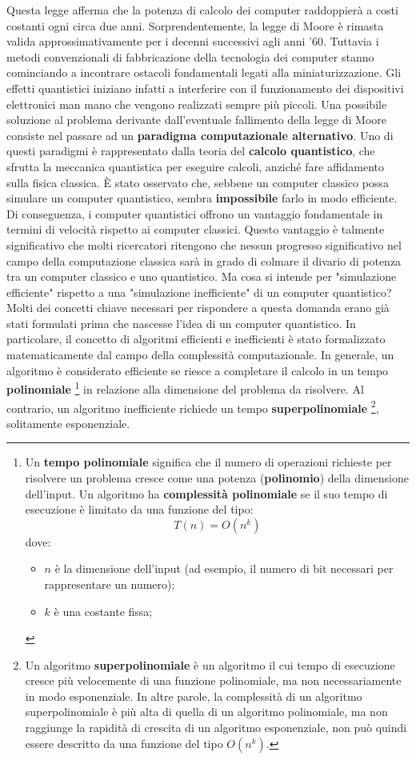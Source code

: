 \documentclass[a4paper,12pt]{report}
\theoremstyle{plain}
\begin{document}
Questa legge afferma che la potenza di calcolo dei computer raddoppierà a costi costanti ogni circa due anni. Sorprendentemente, la legge di Moore è rimasta valida approssimativamente per i decenni successivi agli anni '60. 
Tuttavia i metodi convenzionali di fabbricazione della tecnologia dei computer stanno cominciando a incontrare ostacoli fondamentali legati alla miniaturizzazione. Gli effetti quantistici iniziano infatti a interferire con il funzionamento dei dispositivi elettronici man mano che vengono realizzati sempre più piccoli. 
Una possibile soluzione al problema derivante dall'eventuale fallimento della legge di Moore consiste nel passare ad un \textbf{paradigma computazionale alternativo}. 
Uno di questi paradigmi è rappresentato dalla teoria del \textbf{calcolo quantistico}, che sfrutta la meccanica quantistica per eseguire calcoli, anziché fare affidamento sulla fisica classica. È stato osservato che, sebbene un computer classico possa simulare un computer quantistico, sembra \textbf{impossibile} farlo in modo efficiente. 
Di conseguenza, i computer quantistici offrono un vantaggio fondamentale in termini di velocità rispetto ai computer classici. Questo vantaggio è talmente significativo che molti ricercatori ritengono che nessun progresso significativo nel campo della computazione classica sarà in grado di colmare il divario di potenza tra un computer classico e uno quantistico. 
Ma cosa si intende per "simulazione efficiente" rispetto a una "simulazione inefficiente" di un computer quantistico? Molti dei concetti chiave necessari per rispondere a questa domanda erano già stati formulati prima che nascesse l'idea di un computer quantistico.
In particolare, il concetto di algoritmi efficienti e inefficienti è stato formalizzato matematicamente dal campo della complessità computazionale. In generale, un algoritmo è considerato efficiente se riesce a completare il calcolo in un tempo \textbf{polinomiale}
\footnote{Un \textbf{tempo polinomiale} significa che il numero di operazioni richieste per risolvere un problema cresce come una potenza (\textbf{polinomio}) della dimensione dell'input. Un algoritmo ha \textbf{complessità polinomiale} se il suo tempo di esecuzione è limitato da una funzione del tipo:
\[
T(n) = O(n^k)
\]
dove:
\begin{itemize}
    \item \( n \) è la dimensione dell'input (ad esempio, il numero di bit necessari per rappresentare un numero);
    \item \( k \) è una costante fissa;
\end{itemize}} 
in relazione alla dimensione del problema da risolvere. Al contrario, un algoritmo inefficiente richiede un tempo \textbf{superpolinomiale}
\footnote{Un algoritmo \textbf{superpolinomiale} è un algoritmo il cui tempo di esecuzione cresce più velocemente di una funzione polinomiale, ma non necessariamente in modo esponenziale. In altre parole, la complessità di un algoritmo superpolinomiale è più alta di quella di un algoritmo polinomiale, ma non raggiunge la rapidità di crescita di un algoritmo esponenziale, non può quindi essere descritto da una funzione del tipo \( O(n^k) \).}, solitamente esponenziale.
\end{document}
